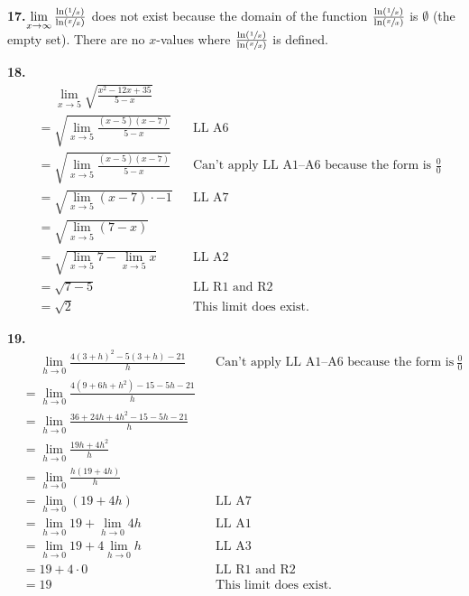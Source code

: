 \documentclass[12pt,]{book}
\theoremstyle{plain}
\theoremstyle{definition}
\numberwithin{equation}{section}
\newcommand{\fe}[2]{\mathop{{#1}{\left(#2\right)}}}
\begin{document}
\noindent\textbf{17.}\quad{}\(\lim\limits_{x\to\infty}\frac{\fe{\ln}{\sfrac{1}{x}}}{\fe{\ln}{\sfrac{x}{x}}}\) does not exist because the domain of the function \(\frac{\fe{\ln}{\sfrac{1}{x}}}{\fe{\ln}{\sfrac{x}{x}}}\) is \(\emptyset\) (the empty set). There are no \(x\)-values where \(\frac{\fe{\ln}{\sfrac{1}{x}}}{\fe{\ln}{\sfrac{x}{x}}}\) is defined.%
\par\smallskip
\noindent\textbf{18.}\quad{}\begin{align*}
&\phantom{={}}\lim\limits_{x\to5}\sqrt{\frac{x^2-12x+35}{5-x}}\\
&=\sqrt{\lim\limits_{x\to5}\frac{(x-5)(x-7)}{5-x}}&&\text{LL A6}\\
&=\sqrt{\lim\limits_{x\to5}\frac{(x-5)(x-7)}{5-x}}&&\text{Can't apply LL A1--A6 because the form is $\tfrac{0}{0}$}\\
&=\sqrt{\lim\limits_{x\to5}(x-7)\cdot-1}&&\text{LL A7}\\
&=\sqrt{\lim\limits_{x\to5}(7-x)}\\
&=\sqrt{\lim\limits_{x\to5}7-\lim\limits_{x\to5}x}&&\text{LL A2}\\
&=\sqrt{7-5}&&\text{LL R1 and R2}\\
&=\sqrt{2}&&\text{This limit does exist.}
\end{align*}%
\par\smallskip
\noindent\textbf{19.}\quad{}\begin{align*}
&\phantom{={}}\lim\limits_{h\to0}\frac{4(3+h)^2-5(3+h)-21}{h}&&\text{Can't apply LL A1--A6 because the form is $\tfrac{0}{0}$}\\
&=\lim\limits_{h\to0}\frac{4(9+6h+h^2)-15-5h-21}{h}\\
&=\lim\limits_{h\to0}\frac{36+24h+4h^2-15-5h-21}{h}\\
&=\lim\limits_{h\to0}\frac{19h+4h^2}{h}\\
&=\lim\limits_{h\to0}\frac{h(19+4h)}{h}\\
&=\lim\limits_{h\to0}\left(19+4h\right)&&\text{LL A7}\\
&=\lim\limits_{h\to0}19+\lim\limits_{h\to0}4h&&\text{LL A1}\\
&=\lim\limits_{h\to0}19+4\lim\limits_{h\to0}h&&\text{LL A3}\\
&=19+4\cdot0&&\text{LL R1 and R2}\\
&=19&&\text{This limit does exist.}
\end{align*}%
\par\smallskip
\end{document}
